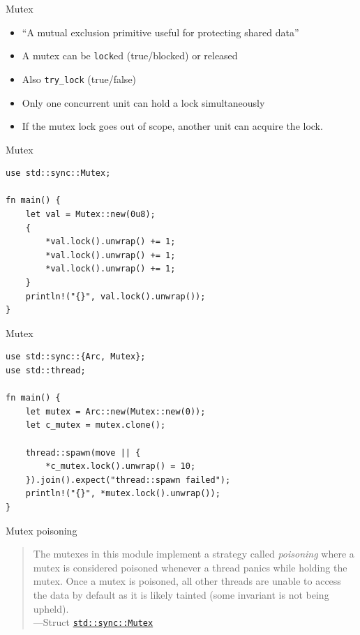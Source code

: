 \documentclass{beamer}
\begin{document}
\begin{frame}[fragile]{Mutex}
  \begin{itemize}
    \item \enquote{A mutual exclusion primitive useful for protecting shared data}
    \item A mutex can be \texttt{lock}ed (true/blocked) or released
    \item Also \texttt{try_lock} (true/false)
    \item Only one concurrent unit can hold a lock simultaneously
    \item If the mutex lock goes out of scope, another unit can acquire the lock.
  \end{itemize}
\end{frame}

\begin{frame}[fragile]{Mutex}
  \begin{verbatim}
use std::sync::Mutex;
  
fn main() {
    let val = Mutex::new(0u8);
    {
        *val.lock().unwrap() += 1;
        *val.lock().unwrap() += 1;
        *val.lock().unwrap() += 1;
    }
    println!("{}", val.lock().unwrap());
}
  \end{verbatim}
\end{frame}

\begin{frame}[fragile]{Mutex}
  \begin{verbatim}
use std::sync::{Arc, Mutex};
use std::thread;

fn main() {
    let mutex = Arc::new(Mutex::new(0));
    let c_mutex = mutex.clone();

    thread::spawn(move || {
        *c_mutex.lock().unwrap() = 10;
    }).join().expect("thread::spawn failed");
    println!("{}", *mutex.lock().unwrap());
}
  \end{verbatim}
\end{frame}

\begin{frame}[fragile]{Mutex poisoning}
  \begin{quote}
The mutexes in this module implement a strategy called \emph{poisoning} where a mutex is considered poisoned whenever a thread panics while holding the mutex. Once a mutex is poisoned, all other threads are unable to access the data by default as it is likely tainted (some invariant is not being upheld). \\
    ---Struct \href{https://doc.rust-lang.org/std/sync/struct.Mutex.html}{\texttt{std::sync::Mutex}}
  \end{quote}
\end{frame}
\end{document}
